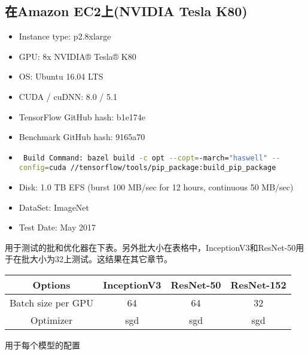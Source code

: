  \subsection{在Amazon EC2上(NVIDIA Tesla K80)}
 \begin{itemize}
	 \item Instance type: p2.8xlarge
         \item GPU: 8x NVIDIA® Tesla® K80
	 \item  OS: Ubuntu 16.04 LTS
	\item 	 CUDA / cuDNN: 8.0 / 5.1
	\item 	 TensorFlow GitHub hash: b1e174e
	\item 	 Benchmark GitHub hash: 9165a70
	\item 	\lstinline[language=Bash]{ Build Command: bazel build -c opt --copt=-march="haswell" --config=cuda //tensorflow/tools/pip_package:build_pip_package}
	\item 	 Disk: 1.0 TB EFS (burst 100 MB/sec for 12 hours, continuous 50 MB/sec)
	\item 	 DataSet: ImageNet
	\item	 Test Date: May 2017
 \end{itemize}
 用于测试的批和优化器在下表。另外批大小在表格中，InceptionV3和ResNet-50用于在批大小为32上测试。这结果在其它章节。
 \begin{table}[H]
	\centering
	 \begin{tabular}{|c|c|c|c|}
		\hline
		 Options	&InceptionV3	&ResNet-50	&ResNet-152\\
		\hline
		 Batch size per GPU	&64	&64	&32\\
		\hline
		 Optimizer	&sgd	&sgd	&sgd\\
		\hline

	 \end{tabular}
 \end{table}
 用于每个模型的配置

